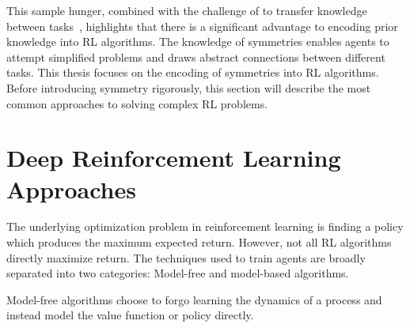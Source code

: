This sample hunger, combined with the challenge of to transfer knowledge between tasks~\cite{kirkpatrick2017overcoming}, highlights that there is a significant advantage to encoding prior knowledge into RL algorithms. The knowledge of symmetries enables agents to attempt simplified problems and draws abstract connections between different tasks. This thesis focuses on the encoding of symmetries into RL algorithms. Before introducing symmetry rigorously, this section will describe the most common approaches to solving complex RL problems.

\section{Deep Reinforcement Learning Approaches}
The underlying optimization problem in reinforcement learning is finding a policy which produces the maximum expected return. However, not all RL algorithms directly maximize return. The techniques used to train agents are broadly separated into two categories: Model-free and model-based algorithms.

Model-free algorithms choose to forgo learning the dynamics of a process and instead model the value function or policy directly.


